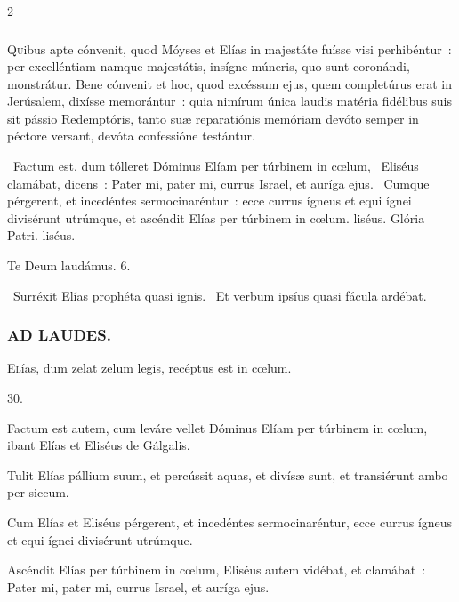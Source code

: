\documentclass[9pt,twoside]{extarticle}
\begin{document}
\begin{multicols}{2}
{\subsubsection*{\center {}}
\lettrine{Q}uibus apte cónvenit, quod Móyses et Elías in majestáte fuísse visi perhibéntur~: per excelléntiam namque majestátis, insígne múneris, quo sunt coronándi, monstrátur. Bene cónvenit et hoc, quod excéssum ejus, quem completúrus erat in Jerúsalem, dixísse memorántur~: quia nimírum única laudis matéria fidélibus suis sit pássio Redemptóris, tanto suæ reparatiónis memóriam devóto semper in péctore versant, devóta confessióne testántur.

\begin{tightlist}{}
\item {}~Factum est, dum tólleret Dóminus Elíam per túrbinem in cœlum, \textred{*}~Eliséus clamábat, dicens~: Pater mi, pater mi, currus Israel, et auríga ejus. ~Cumque pérgerent, et incedéntes sermocinaréntur~: ecce currus ígneus et equi ígnei divisérunt utrúmque, et ascéndit Elías per túrbinem in cœlum. liséus. Glória Patri. liséus.
\item Te Deum laudámus. 6.
\item {}~Surréxit Elías prophéta quasi ignis. ~Et verbum ipsíus quasi fácula ardébat.
\end{tightlist}

\subsubsection*{\center \textsc{AD LAUDES.}}
\begin{center}\end{center}
\lettrine{E}lías, dum zelat zelum legis, recéptus est in cœlum.

\begin{tightlist}
\item {} 30.
\item {} Factum est autem, cum leváre vellet Dóminus Elíam per túrbinem in cœlum, ibant Elías et Eliséus de Gálgalis.
\item {} Tulit Elías pállium suum, et percússit aquas, et divísæ sunt, et transiérunt ambo per siccum.
\item {} Cum Elías et Eliséus pérgerent, et incedéntes sermocinaréntur, ecce currus ígneus et equi ígnei divisérunt utrúmque.
\item {} Ascéndit Elías per túrbinem in cœlum, Eliséus autem vidébat, et clamábat~: Pater mi, pater mi, currus Israel, et auríga ejus.
\end{tightlist}

}
\end{multicols}
\end{document}
